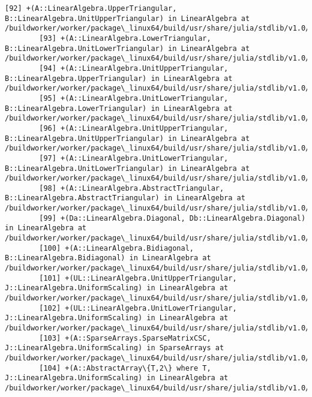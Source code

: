 \documentclass[11pt]{article}
\begin{document}
\begin{Verbatim}[commandchars=\\\{\}]
        [92] +(A::LinearAlgebra.UpperTriangular, B::LinearAlgebra.UnitUpperTriangular) in LinearAlgebra at /buildworker/worker/package\_linux64/build/usr/share/julia/stdlib/v1.0/LinearAlgebra/src/triangular.jl:489
        [93] +(A::LinearAlgebra.LowerTriangular, B::LinearAlgebra.UnitLowerTriangular) in LinearAlgebra at /buildworker/worker/package\_linux64/build/usr/share/julia/stdlib/v1.0/LinearAlgebra/src/triangular.jl:490
        [94] +(A::LinearAlgebra.UnitUpperTriangular, B::LinearAlgebra.UpperTriangular) in LinearAlgebra at /buildworker/worker/package\_linux64/build/usr/share/julia/stdlib/v1.0/LinearAlgebra/src/triangular.jl:491
        [95] +(A::LinearAlgebra.UnitLowerTriangular, B::LinearAlgebra.LowerTriangular) in LinearAlgebra at /buildworker/worker/package\_linux64/build/usr/share/julia/stdlib/v1.0/LinearAlgebra/src/triangular.jl:492
        [96] +(A::LinearAlgebra.UnitUpperTriangular, B::LinearAlgebra.UnitUpperTriangular) in LinearAlgebra at /buildworker/worker/package\_linux64/build/usr/share/julia/stdlib/v1.0/LinearAlgebra/src/triangular.jl:493
        [97] +(A::LinearAlgebra.UnitLowerTriangular, B::LinearAlgebra.UnitLowerTriangular) in LinearAlgebra at /buildworker/worker/package\_linux64/build/usr/share/julia/stdlib/v1.0/LinearAlgebra/src/triangular.jl:494
        [98] +(A::LinearAlgebra.AbstractTriangular, B::LinearAlgebra.AbstractTriangular) in LinearAlgebra at /buildworker/worker/package\_linux64/build/usr/share/julia/stdlib/v1.0/LinearAlgebra/src/triangular.jl:495
        [99] +(Da::LinearAlgebra.Diagonal, Db::LinearAlgebra.Diagonal) in LinearAlgebra at /buildworker/worker/package\_linux64/build/usr/share/julia/stdlib/v1.0/LinearAlgebra/src/diagonal.jl:152
        [100] +(A::LinearAlgebra.Bidiagonal, B::LinearAlgebra.Bidiagonal) in LinearAlgebra at /buildworker/worker/package\_linux64/build/usr/share/julia/stdlib/v1.0/LinearAlgebra/src/bidiag.jl:304
        [101] +(UL::LinearAlgebra.UnitUpperTriangular, J::LinearAlgebra.UniformScaling) in LinearAlgebra at /buildworker/worker/package\_linux64/build/usr/share/julia/stdlib/v1.0/LinearAlgebra/src/uniformscaling.jl:104
        [102] +(UL::LinearAlgebra.UnitLowerTriangular, J::LinearAlgebra.UniformScaling) in LinearAlgebra at /buildworker/worker/package\_linux64/build/usr/share/julia/stdlib/v1.0/LinearAlgebra/src/uniformscaling.jl:104
        [103] +(A::SparseArrays.SparseMatrixCSC, J::LinearAlgebra.UniformScaling) in SparseArrays at /buildworker/worker/package\_linux64/build/usr/share/julia/stdlib/v1.0/SparseArrays/src/sparsematrix.jl:3465
        [104] +(A::AbstractArray\{T,2\} where T, J::LinearAlgebra.UniformScaling) in LinearAlgebra at /buildworker/worker/package\_linux64/build/usr/share/julia/stdlib/v1.0/LinearAlgebra/src/uniformscaling.jl:114

\end{Verbatim}
\end{document}
